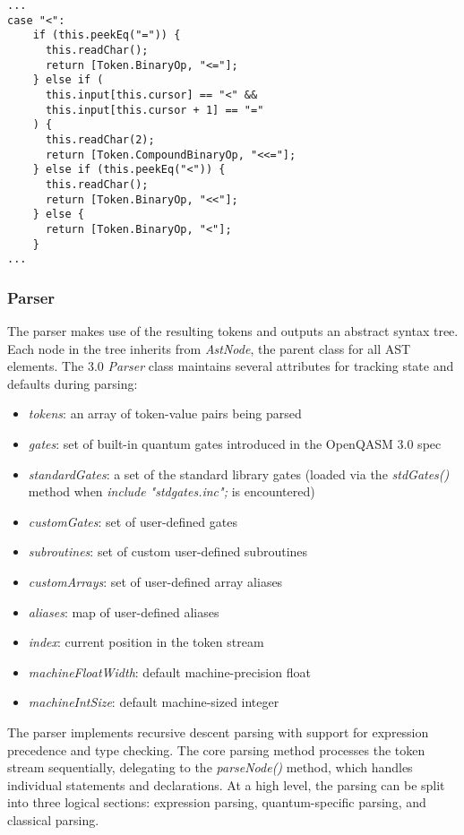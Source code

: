 \documentclass{article}
\begin{document}
\begin{lstlisting}
...
case "<":
    if (this.peekEq("=")) {
      this.readChar();
      return [Token.BinaryOp, "<="];
    } else if (
      this.input[this.cursor] == "<" &&
      this.input[this.cursor + 1] == "="
    ) {
      this.readChar(2);
      return [Token.CompoundBinaryOp, "<<="];
    } else if (this.peekEq("<")) {
      this.readChar();
      return [Token.BinaryOp, "<<"];
    } else {
      return [Token.BinaryOp, "<"];
    }
...
\end{lstlisting}

\subsubsection{Parser}

The parser makes use of the resulting tokens and outputs an abstract syntax tree. Each node in the tree inherits from \textit{AstNode}, the parent class for all AST elements. The 3.0 \textit{Parser} class maintains several attributes for tracking state and defaults during parsing:

\begin{itemize}
    \item \textit{tokens}: an array of token-value pairs being parsed
    \item \textit{gates}: set of built-in quantum gates introduced in the OpenQASM 3.0 spec
    \item \textit{standardGates}: a set of the standard library gates (loaded via the \textit{stdGates()} method when \textit{include "stdgates.inc";} is encountered)
    \item \textit{customGates}: set of user-defined gates
    \item \textit{subroutines}: set of custom user-defined subroutines
    \item \textit{customArrays}: set of user-defined array aliases
    \item \textit{aliases}: map of user-defined aliases
    \item \textit{index}: current position in the token stream
    \item \textit{machineFloatWidth}: default machine-precision float
    \item \textit{machineIntSize}: default machine-sized integer
\end{itemize}

The parser implements recursive descent parsing with support for expression precedence and type checking. The core parsing method processes the token stream sequentially, delegating to the \textit{parseNode()} method, which handles individual statements and declarations. At a high level, the parsing can be split into three logical sections: expression parsing, quantum-specific parsing, and classical parsing.
\end{document}
